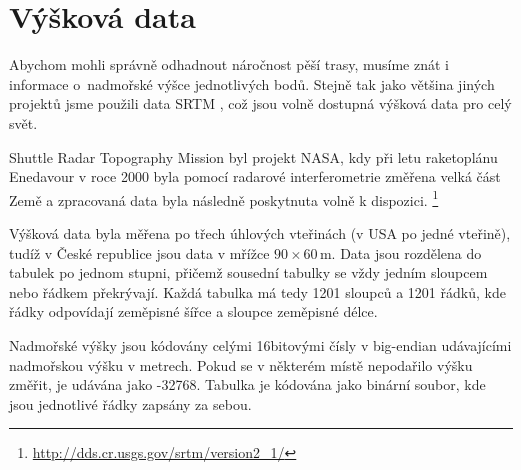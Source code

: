 \section{Výšková data}
Abychom mohli správně odhadnout náročnost pěší trasy, musíme znát i informace
o~nadmořské výšce jednotlivých bodů. Stejně tak jako většina jiných projektů jsme
použili data SRTM \cite{srtmweb}, což jsou volně dostupná výšková data pro celý
svět.

Shuttle Radar Topography Mission byl projekt NASA, kdy při letu raketoplánu
Enedavour v roce 2000 byla pomocí radarové interferometrie změřena velká část
Země a zpracovaná data byla následně poskytnuta volně k dispozici.
\footnote{\url{http://dds.cr.usgs.gov/srtm/version2_1/}} 

Výšková data byla měřena po třech úhlových vteřinách (v USA po jedné vteřině),
tudíž v České republice jsou data v mřížce $90\times60$\,m. Data jsou rozdělena
do tabulek po jednom stupni, přičemž sousední tabulky se vždy jedním sloupcem
nebo řádkem překrývají. Každá tabulka má tedy 1201 sloupců a 1201 řádků, kde
řádky odpovídají zeměpisné šířce a sloupce zeměpisné délce.

Nadmořské výšky jsou kódovány celými 16bitovými čísly v big-endian udávajícími
nadmořskou výšku v metrech. Pokud se v některém místě nepodařilo výšku změřit,
je udávána jako -32768. Tabulka je kódována jako binární soubor, kde jsou
jednotlivé řádky zapsány za sebou.
